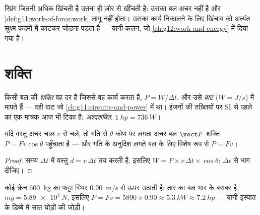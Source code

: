 \begin{remark}[और स्प्रिंग का क्या?]\label{rem:g11:work-of-force:spring}
स्प्रिंग जितनी अधिक खिंचती है उतना ही ज़ोर से खींचती है: उसका बल अचर
नहीं है और \cref{def:g11:work-of-force:work} लागू नहीं होता। उसका कार्य निकालने के लिए खिंचाव
को अत्यंत सूक्ष्म क़दमों में काटकर जोड़ना पड़ता है --- यानी कलन, जो \cref{ch:g12:work-and-energy}
में दिया गया है।
\end{remark}

\section{शक्ति}

\begin{definition}[शक्ति]\label{def:g11:work-of-force:power}
किसी बल की \emph{शक्ति} वह दर है जिससे वह
कार्य करता है, $P = W/\Delta t$, और उसे \emph{वाट} ($\unit{W} = \unit{J/s}$) में
मापते हैं --- वही वाट जो \cref{ch:g11:circuits-and-power} में था। इंजनों की तख़्तियों पर SI से पहले
का एक मात्रक आज भी टिका है: \emph{अश्वशक्ति},
$\qty{1}{hp} = \qty{736}{W}$।
\end{definition}

\begin{proposition}[अचर वेग पर शक्ति]\label{prop:g11:work-of-force:pfv}
यदि वस्तु अचर चाल $v$ से चले, तो गति से $\theta$ कोण पर लगता अचर
बल $\vect F$ शक्ति $P = F v \cos\theta$ पहुँचाता है --- और गति के अनुदिश
लगते बल के लिए विशेष रूप से $P = Fv$।
\end{proposition}

\begin{proof}
समय $\Delta t$ में वस्तु $d = v\,\Delta t$ तय करती है, इसलिए $W = F \times v\,\Delta t \times \cos\theta$; $\Delta t$ से भाग
दीजिए।
\end{proof}

\begin{example}[क्रेन]\label{ex:g11:work-of-force:crane}
कोई क्रेन \qty{600}{kg} का फट्टा स्थिर \qty{0.90}{m/s} से ऊपर उठाती है: तार का
बल भार के बराबर है, $mg = \qty{5.89e3}{N}$, इसलिए
$P = Fv = 5890 \times 0.90 \approx \qty{5.3}{kW} \approx \qty{7.2}{hp}$
--- यानी इस्पात के डिब्बे में सात घोड़ों की जोड़ी।
\end{example}

